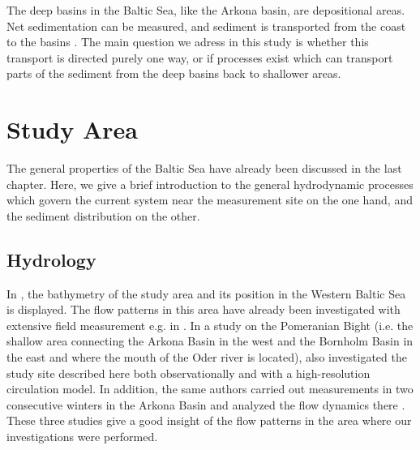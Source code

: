  The deep basins in the Baltic Sea, like the Arkona basin, are depositional 
areas. Net sedimentation can be measured, and sediment is transported from the 
coast to the basins \citep[][]{basys1, basys2}. The main question we adress in 
this study is whether this transport is directed purely one way, or if processes 
exist which can transport parts of the sediment from the deep basins back to 
shallower areas.

\section{Study Area}

The general properties of the Baltic Sea have already been discussed in the 
last chapter. Here, we give a brief introduction to the general hydrodynamic 
processes which govern the current system near the measurement site on the one 
hand, and the sediment distribution on the other.

\subsection{Hydrology}

In , the bathymetry of the study area and its position in the 
Western Baltic Sea is displayed. The flow patterns in this area have already 
been investigated with extensive field measurement e.g. in \cite{lass1993}. In 
a study on the Pomeranian Bight (i.e. the shallow area connecting the Arkona 
Basin in the west and the Bornholm Basin in the east and where the mouth of the 
Oder river is located), \cite{lass2001} also investigated the study site 
described here both observationally and with a high-resolution circulation 
model. In addition, the same authors carried out measurements in two consecutive 
winters in the Arkona Basin and analyzed the flow dynamics there 
\citep[][]{lass2003}. These three studies give a good insight 
of the flow patterns in the area where our investigations were performed.
 
